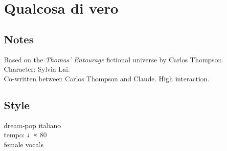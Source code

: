 \section{Qualcosa di vero}

\subsection{Notes}
Based on the \emph{Thomas' Entourage} fictional universe by Carlos Thompson.\\
Character: Sylvia Lai.\\
Co-written between Carlos Thompson and Claude. High interaction.

\subsection{Style}
dream-pop italiano\\
tempo: ♩≈ 80\\
female vocals


